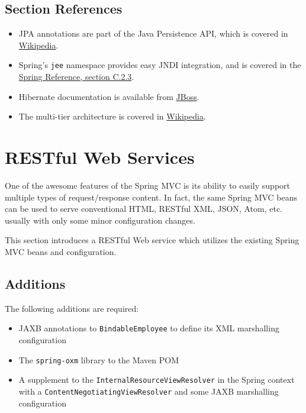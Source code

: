\documentclass{article}
\begin{document}


\subsection{Section References}

\begin{itemize}
\item JPA annotations are part of the Java Persistence API, which is covered in \href{http://en.wikipedia.org/wiki/Java_Persistence_API}{Wikipedia}.
\item Spring's \texttt{jee} namespace provides easy JNDI integration, and is covered in the \href{http://static.springsource.org/spring/docs/3.0.x/spring-framework-reference/html/xsd-config.html#xsd-config-body-schemas-jee}{Spring Reference, section C.2.3}.
\item Hibernate documentation is available from \href{http://docs.jboss.org/hibernate/stable/core/reference/en/html/}{JBoss}.
\item The multi-tier architecture is covered in \href{http://en.wikipedia.org/wiki/Multitier_architecture}{Wikipedia}.
\end{itemize}

\pagebreak
\section{RESTful Web Services}

One of the awesome features of the Spring MVC is its ability to easily support multiple types of request/response content.  In fact, the same Spring MVC beans can be used to serve conventional HTML, RESTful XML, JSON, Atom, etc. usually with only some minor configuration changes.

This section introduces a RESTful Web service which utilizes the existing Spring MVC beans and configuration.

\subsection{Additions}

The following additions are required:

\begin{itemize}
\item JAXB annotations to \texttt{BindableEmployee} to define its XML marshalling configuration
\item The \texttt{spring-oxm} library to the Maven POM
\item A supplement to the \texttt{InternalResourceViewResolver} in the Spring context with a \texttt{ContentNegotiatingViewResolver} and some JAXB marshalling configuration
\end{itemize}
\end{document}

